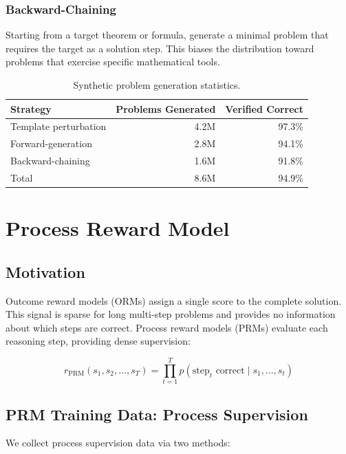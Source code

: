 \documentclass[11pt,a4paper]{article}
\begin{document}
\subsubsection{Backward-Chaining}

Starting from a target theorem or formula, generate a minimal problem that requires
the target as a solution step. This biases the distribution toward problems that
exercise specific mathematical tools.

\begin{table}[H]
\centering
\begin{tabular}{lrr}
\toprule
\textbf{Strategy} & \textbf{Problems Generated} & \textbf{Verified Correct} \\
\midrule
Template perturbation & 4.2M & 97.3\% \\
Forward-generation & 2.8M & 94.1\% \\
Backward-chaining & 1.6M & 91.8\% \\
Total & 8.6M & 94.9\% \\
\bottomrule
\end{tabular}
\caption{Synthetic problem generation statistics.}
\end{table}

\section{Process Reward Model}

\subsection{Motivation}

Outcome reward models (ORMs) assign a single score to the complete solution.
This signal is sparse for long multi-step problems and provides no information
about which steps are correct. Process reward models (PRMs) evaluate each reasoning
step, providing dense supervision:

\begin{equation}
r_\text{PRM}(s_1, s_2, \ldots, s_T) = \prod_{t=1}^T p(\text{step}_t \text{ correct} \mid s_1, \ldots, s_t)
\end{equation}

\subsection{PRM Training Data: Process Supervision}

We collect process supervision data via two methods:
\end{document}
